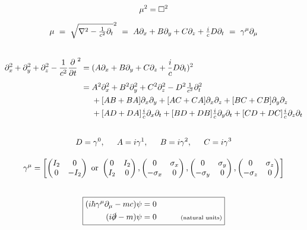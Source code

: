 \documentclass[12pt]{article}
\begin{document}
\begin{gather*}
    \mu^2 = \square^2
        \\[5pt]
    \mu \ =\ \sqrt{\nabla^2 - \tfrac{1}{c^2} \partial_t}^2     
        \ =\ A \partial_x + B \partial_y + C \partial_z + \tfrac{i}{c} D \partial_t
        \ =\ \gamma^\mu \partial_\mu
        \\[20pt]
    \begin{aligned}
        \partial_x^2 + \partial_y^2 + \partial_z^2 - \frac{1}{c^2} \frac{\partial}{\partial t}^2 &= 
            (A \partial_x + B \partial_y + C \partial_z + \frac{i}{c} D \partial_t)^2\\[5pt]   
        &= \begin{aligned}[t]
            & A^2 \partial_x^2 
                + B^2 \partial_y^2 
                + C^2 \partial_z^2 
                - D^2 \tfrac{1}{c^2} \partial_t^2
                \\
            & + [AB+BA]\partial_x\partial_y 
                + [AC+CA]\partial_x\partial_z 
                + [BC+CB]\partial_y\partial_z
                \\
            & + [AD+DA]\tfrac{i}{c}\partial_x\partial_t 
                + [BD+DB]\tfrac{i}{c}\partial_y\partial_t 
                + [CD+DC]\tfrac{i}{c}\partial_z\partial_t
        \end{aligned}
    \end{aligned}\\[20pt]
    D=\gamma^0, \indent A=i\gamma^1, \indent B=i\gamma^2, \indent C=i\gamma^3\\[10pt]
    \gamma^\mu = \left[ 
        \left(\begin{matrix}
            I_2 & 0\\
            0 & - I_2
        \end{matrix}\right) 
        \text{ or } 
        \left(\begin{matrix}
            0 & I_2\\
            I_2 & 0
        \end{matrix}\right) 
        ,  
        \left(\begin{matrix}
            0 & \sigma_x\\
            -\sigma_x & 0
        \end{matrix}\right)
        ,  
        \left(\begin{matrix}
            0 & \sigma_y\\
            -\sigma_y & 0
        \end{matrix}\right)
        , 
        \left(\begin{matrix}
            0 & \sigma_z\\
            -\sigma_z & 0
        \end{matrix}\right)
        \right]\\[20pt]
    \boxed{ \begin{aligned}
        (i\hbar \gamma^\mu \partial_\mu - mc) \psi &= 0\\
        (i \slashed{\partial} - m)\psi &= 0 \indent \indent \text{\scriptsize(natural units)}
    \end{aligned} }
\end{gather*}
\end{document}
